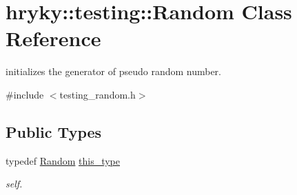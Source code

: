 \hypertarget{classhryky_1_1testing_1_1_random}{\section{hryky\-:\-:testing\-:\-:Random Class Reference}
\label{classhryky_1_1testing_1_1_random}
}


initializes the generator of pseudo random number.  




{\ttfamily \#include $<$testing\-\_\-random.\-h$>$}

\subsection*{Public Types}
\begin{DoxyCompactItemize}
\item 
\hypertarget{classhryky_1_1testing_1_1_random_a9ba232c45fe9f72a7de3f8074841a600}{typedef \hyperlink{classhryky_1_1testing_1_1_random}{Random} \hyperlink{classhryky_1_1testing_1_1_random_a9ba232c45fe9f72a7de3f8074841a600}{this\-\_\-type}}\label{classhryky_1_1testing_1_1_random_a9ba232c45fe9f72a7de3f8074841a600}

\begin{DoxyCompactList}\small\item\em self. \end{DoxyCompactList}\end{DoxyCompactItemize}
